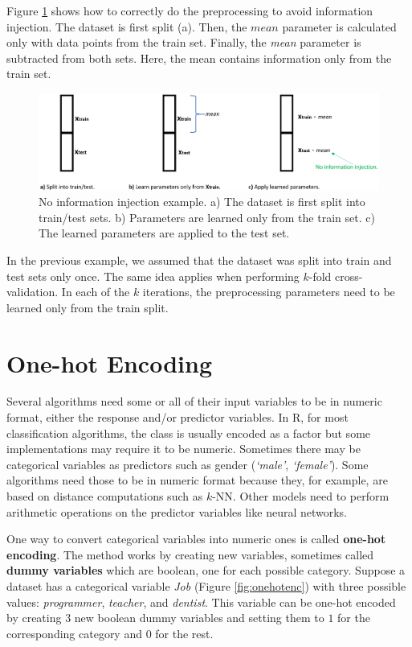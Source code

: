 \documentclass[
  11pt,
]{krantz}
\begin{document}
Figure \ref{fig:injection2} shows how to correctly do the preprocessing to avoid information injection. The dataset is first split (a). Then, the \(mean\) parameter is calculated only with data points from the train set. Finally, the \emph{mean} parameter is subtracted from both sets. Here, the mean contains information only from the train set.

\begin{figure}

{\centering \includegraphics[width=0.9\linewidth]{images/info_injection_2} 

}

\caption{No information injection example. a) The dataset is first split into train/test sets. b) Parameters are learned only from the train set. c) The learned parameters are applied to the test set.}\label{fig:injection2}
\end{figure}

In the previous example, we assumed that the dataset was split into train and test sets only once. The same idea applies when performing \(k\)-fold cross-validation. In each of the \(k\) iterations, the preprocessing parameters need to be learned only from the train split.

\hypertarget{one-hot-encoding}{%
\section{One-hot Encoding}\label{one-hot-encoding}}

Several algorithms need some or all of their input variables to be in numeric format, either the response and/or predictor variables. In R, for most classification algorithms, the class is usually encoded as a factor but some implementations may require it to be numeric. Sometimes there may be categorical variables as predictors such as gender (\emph{`male'}, \emph{`female'}). Some algorithms need those to be in numeric format because they, for example, are based on distance computations such as \(k\)-NN. Other models need to perform arithmetic operations on the predictor variables like neural networks.

One way to convert categorical variables into numeric ones is called \textbf{one-hot encoding}. The method works by creating new variables, sometimes called \textbf{dummy variables} which are boolean, one for each possible category. Suppose a dataset has a categorical variable \emph{Job} (Figure \ref{fig:onehotenc}) with three possible values: \emph{programmer}, \emph{teacher}, and \emph{dentist}. This variable can be one-hot encoded by creating \(3\) new boolean dummy variables and setting them to \(1\) for the corresponding category and \(0\) for the rest.
\end{document}
